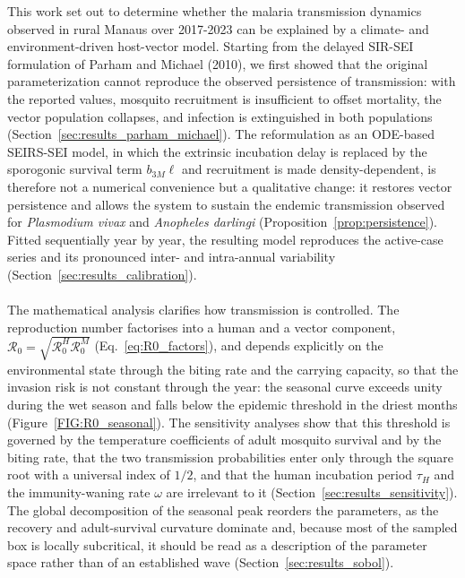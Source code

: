 \documentclass[a4paper,fleqn]{cas-dc}
\begin{document}
This work set out to determine whether the malaria transmission dynamics observed in
rural Manaus over 2017-2023 can be explained by a climate- and environment-driven
host-vector model. Starting from the delayed SIR-SEI formulation of Parham and Michael
(2010), we first showed that the original parameterization cannot reproduce the observed
persistence of transmission: with the reported values, mosquito recruitment is insufficient
to offset mortality, the vector population collapses, and infection is extinguished in both
populations (Section~\ref{sec:results_parham_michael}). The reformulation as an ODE-based
SEIRS-SEI model, in which the extrinsic incubation delay is replaced by the sporogonic
survival term $b_{3M}\ell$ and recruitment is made density-dependent, is therefore not a
numerical convenience but a qualitative change: it restores vector persistence and allows
the system to sustain the endemic transmission observed for \textit{Plasmodium vivax} and
\textit{Anopheles darlingi} (Proposition~\ref{prop:persistence}). Fitted sequentially year
by year, the resulting model reproduces the active-case series and its pronounced inter-
and intra-annual variability (Section~\ref{sec:results_calibration}).
\\\\
The mathematical analysis clarifies how transmission is controlled. The reproduction
number factorises into a human and a vector component, $\mathcal{R}_0=\sqrt{\mathcal{R}_0^H
\mathcal{R}_0^M}$ (Eq.~\eqref{eq:R0_factors}), and depends explicitly on the environmental
state through the biting rate and the carrying capacity, so that the invasion risk is not
constant through the year: the seasonal curve exceeds unity during the wet season and falls
below the epidemic threshold in the driest months (Figure~\ref{FIG:R0_seasonal}). The
sensitivity analyses show that this threshold is governed by the temperature coefficients
of adult mosquito survival and by the biting rate, that the two transmission probabilities
enter only through the square root with a universal index of $1/2$, and that the human
incubation period $\tau_H$ and the immunity-waning rate $\omega$ are irrelevant to it
(Section~\ref{sec:results_sensitivity}). The global decomposition of the seasonal peak
reorders the parameters, as the recovery and adult-survival curvature dominate and, because most
of the sampled box is locally subcritical, it should be read as a description of the
parameter space rather than of an established wave (Section~\ref{sec:results_sobol}).
\\\\
\end{document}
